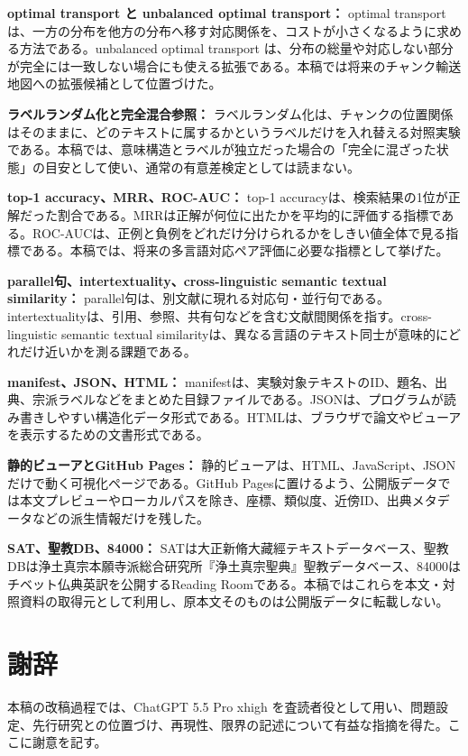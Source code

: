 \documentclass[uplatex,dvipdfmx,11pt,a4paper]{jsarticle}
\begin{document}
\noindent\textbf{optimal transport と unbalanced optimal transport：} optimal transport は、一方の分布を他方の分布へ移す対応関係を、コストが小さくなるように求める方法である。unbalanced optimal transport は、分布の総量や対応しない部分が完全には一致しない場合にも使える拡張である。本稿では将来のチャンク輸送地図への拡張候補として位置づけた。

\noindent\textbf{ラベルランダム化と完全混合参照：} ラベルランダム化は、チャンクの位置関係はそのままに、どのテキストに属するかというラベルだけを入れ替える対照実験である。本稿では、意味構造とラベルが独立だった場合の「完全に混ざった状態」の目安として使い、通常の有意差検定としては読まない。

\noindent\textbf{top-1 accuracy、MRR、ROC-AUC：} top-1 accuracyは、検索結果の1位が正解だった割合である。MRRは正解が何位に出たかを平均的に評価する指標である。ROC-AUCは、正例と負例をどれだけ分けられるかをしきい値全体で見る指標である。本稿では、将来の多言語対応ペア評価に必要な指標として挙げた。

\noindent\textbf{parallel句、intertextuality、cross-linguistic semantic textual similarity：} parallel句は、別文献に現れる対応句・並行句である。intertextualityは、引用、参照、共有句などを含む文献間関係を指す。cross-linguistic semantic textual similarityは、異なる言語のテキスト同士が意味的にどれだけ近いかを測る課題である。

\noindent\textbf{manifest、JSON、HTML：} manifestは、実験対象テキストのID、題名、出典、宗派ラベルなどをまとめた目録ファイルである。JSONは、プログラムが読み書きしやすい構造化データ形式である。HTMLは、ブラウザで論文やビューアを表示するための文書形式である。

\noindent\textbf{静的ビューアとGitHub Pages：} 静的ビューアは、HTML、JavaScript、JSONだけで動く可視化ページである。GitHub Pagesに置けるよう、公開版データでは本文プレビューやローカルパスを除き、座標、類似度、近傍ID、出典メタデータなどの派生情報だけを残した。

\noindent\textbf{SAT、聖教DB、84000：} SATは大正新脩大藏經テキストデータベース、聖教DBは浄土真宗本願寺派総合研究所『浄土真宗聖典』聖教データベース、84000はチベット仏典英訳を公開するReading Roomである。本稿ではこれらを本文・対照資料の取得元として利用し、原本文そのものは公開版データに転載しない。

\section*{謝辞}

本稿の改稿過程では、ChatGPT 5.5 Pro xhigh を査読者役として用い、問題設定、先行研究との位置づけ、再現性、限界の記述について有益な指摘を得た。ここに謝意を記す。
\end{document}
